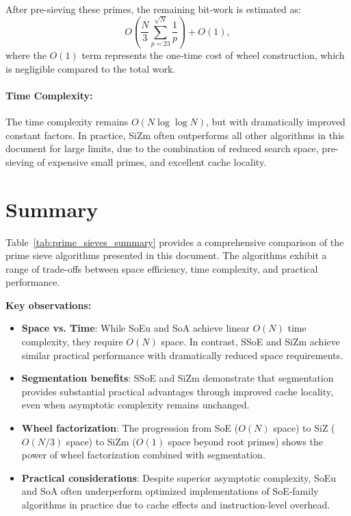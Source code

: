 \documentclass{article}
\begin{document}
After pre-sieving these primes, the remaining bit-work is estimated as:
\[
O\left(\frac{N}{3}\sum_{p=23}^{\sqrt N}\frac{1}{p}\right) + O(1),
\]
where the $O(1)$ term represents the one-time cost of wheel construction, which is negligible compared to the total work.

\paragraph{Time Complexity:} The time complexity remains $O(N \log \log N)$, but with dramatically improved constant factors. In practice, SiZm often outperforms all other algorithms in this document for large limits, due to the combination of reduced search space, pre-sieving of expensive small primes, and excellent cache locality.



\section{Summary}

Table~\ref{tab:prime_sieves_summary} provides a comprehensive comparison of the prime sieve algorithms presented in this document. The algorithms exhibit a range of trade-offs between space efficiency, time complexity, and practical performance.

\textbf{Key observations:}
\begin{itemize}[noitemsep]
    \item \textbf{Space vs. Time}: While SoEu and SoA achieve linear $O(N)$ time complexity, they require $O(N)$ space. In contrast, SSoE and SiZm achieve similar practical performance with dramatically reduced space requirements.
    \item \textbf{Segmentation benefits}: SSoE and SiZm demonstrate that segmentation provides substantial practical advantages through improved cache locality, even when asymptotic complexity remains unchanged.
    \item \textbf{Wheel factorization}: The progression from SoE ($O(N)$ space) to SiZ ($O(N/3)$ space) to SiZm ($O(1)$ space beyond root primes) shows the power of wheel factorization combined with segmentation.
    \item \textbf{Practical considerations}: Despite superior asymptotic complexity, SoEu and SoA often underperform optimized implementations of SoE-family algorithms in practice due to cache effects and instruction-level overhead.
\end{itemize}
\end{document}
